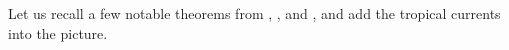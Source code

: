 \documentclass[11pt]{amsart}
\def\Log{{\rm Log}}
\theoremstyle{definition}
\newtheorem{lemma}[theorem]{Lemma}
\newcommand{\Z}{\mathbb{Z}}
\newcommand{\lto}{\longrightarrow}
\newcommand{\cC}{\mathcal{C}}
\newcommand{\sT}{\mathscr{T}}
\newcommand{\supp}[1]{{\mathrm{supp}(#1)}}
\begin{document}


Let us recall a few notable theorems from \cite{McMullen-polytope-alg}, \cite{Fulton--Sturmfels}, and \cite{Jensen-Yu}, and add the tropical currents into the picture. 
\end{document}
